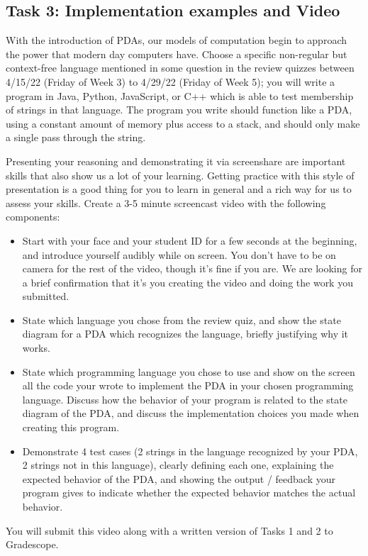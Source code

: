 \subsection{Task 3: Implementation examples and Video}
 With the introduction of PDAs, our models of computation begin to approach the power that 
 modern day computers have. 
 Choose a specific non-regular but context-free language mentioned in some question 
 in the review quizzes between 4/15/22 (Friday of Week 3) 
 to 4/29/22 (Friday of Week 5); you will write a program in Java, Python, JavaScript, or C++
 which is able to test membership of strings in 
 that language.
 The program you write should function like a PDA, using a constant amount of memory plus 
 access to a stack, 
 and should only make a single pass through the string.
	

 Presenting your reasoning and demonstrating it via screenshare are important skills that 
 also show us a lot of your learning. Getting practice with this style of presentation is a 
 good thing for you to learn in general and a rich way for us to assess your skills. Create 
 a 3-5 minute screencast video with the following components:
 \begin{itemize}
	\item Start with your face and your student ID for a few seconds at the beginning, and introduce yourself audibly while on screen. 
	You don't have to be on camera for the rest of the video, though it's fine if you are. 
	We are looking for a brief confirmation that it's you creating the video and 
	doing the work you submitted.
	\item State which language you chose from the review quiz, and show the state diagram for 
	a PDA which recognizes the language, briefly justifying why it works.
	\item State which programming language you chose to use and show on the 
	screen all the code your wrote to implement the PDA in your chosen programming language.
	Discuss how the behavior of your program is related to the state diagram of the PDA, 
	and discuss the implementation choices you made when creating this program.
	\item Demonstrate 4 test cases (2 strings in the language recognized by your PDA, 
	2 strings not in this language), clearly defining each one, 
	explaining the expected behavior of the PDA, and 
	showing the output / feedback your program gives to indicate whether the expected behavior 
	matches the actual behavior.
\end{itemize}
You will submit this video along with a written version of Tasks 1 and 2 to Gradescope.

